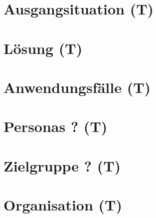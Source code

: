 \section{Ausgangsituation (T)}


\section{Lösung (T)}


\section{Anwendungsfälle (T)}


\section{Personas ? (T)}


\section{Zielgruppe ? (T)}


\section{Organisation (T)}
